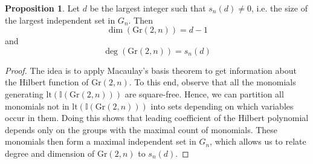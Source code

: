 \documentclass{scrartcl}
\newcommand{\I}{\mathbb{I}}
\newcommand{\Gr}{\mathrm{Gr}}
\theoremstyle{definition}
\newtheorem{proposition}[definition]{Proposition}
\begin{document}
\begin{proposition}
    Let $d$ be the largest integer such that $s_n(d) \neq 0$, i.e. the size of the largest independent set in $G_n$.
    Then
    \begin{equation*}
        \dim(\Gr(2, n)) = d - 1
    \end{equation*}
    and
    \begin{equation*}
        \deg(\Gr(2, n)) = s_n(d)
    \end{equation*}
\end{proposition}
\begin{proof}
    The idea is to apply Macaulay's basis theorem to get information about the Hilbert function of $\Gr(2, n)$.
    To this end, observe that all the monomials generating $\mathrm{lt}(\I(\Gr(2, n)))$ are square-free.
    Hence, we can partition all monomials not in $\mathrm{lt}(\I(\Gr(2, n)))$ into sets depending on which variables occur in them.
    Doing this shows that leading coefficient of the Hilbert polynomial depends only on the groups with the maximal count of monomials.
    These monomials then form a maximal independent set in $G_n$, which allows us to relate degree and dimension of $\Gr(2, n)$ to $s_n(d)$. 


\end{proof}
\end{document}
